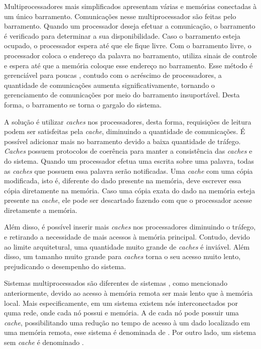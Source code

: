 Multiprocessadores \uma mais simplificados apresentam várias \cpus e memórias conectadas à um
único barramento. Comunicações nesse multiprocessador são feitas pelo
barramento. Quando um processador deseja efetuar a comunicação, o barramento é
verificado para determinar a sua disponibilidade. Caso o barramento esteja
ocupado, o processador espera até que ele fique livre. Com o barramento livre, o
processador coloca o endereço da palavra no barramento, utiliza sinais de
controle e espera até que a memória coloque esse endereço no barramento. Esse
método é gerenciável para poucas \cpus, contudo com o acréscimo de
processadores, a quantidade de comunicações aumenta significativamente, tornando
o gerenciamento de comunicações por meio do barramento insuportável. Desta
forma, o barramento se torna o gargalo do sistema.

A solução é utilizar \textit{caches} nos processadores, desta forma, requisições
de leitura podem ser satisfeitas pela \textit{cache}, diminuindo a quantidade de
comunicações. É possível adicionar mais \cpus no barramento devido a baixa
quantidade de tráfego. \textit{Caches} possuem protocolos de coerência para
manter a consistência das \textit{caches} e do sistema. Quando um processador
efetua uma escrita sobre uma palavra, todas as \textit{caches} que possuem essa
palavra serão notificadas. Uma \textit{cache} com uma cópia modificada, isto é,
diferente do dado presente na memória, deve escrever essa cópia diretamente na
memória. Caso uma cópia exata do dado na memória esteja presente na
\textit{cache}, ele pode ser descartado fazendo com que o processador acesse
diretamente a memória.

Além disso, é possível inserir mais \textit{caches} nos processadores
diminuindo o tráfego, e retirando a necessidade de mais acessos à memória
principal. Contudo, devido ao limite arquitetural, uma quantidade muito grande
de \textit{caches} é inviável. Além disso, um tamanho muito grande para
\textit{caches} torna o seu acesso muito lento, prejudicando o desempenho do
sistema.

Sistemas multiprocessados \numa são diferentes de sistemas \uma, como mencionado
anteriormente, devido ao acesso à memória remota ser mais lento que à memória
local. Mais especificamente, em um sistema \numa existem nós interconectados por
quma rede, onde cada nó possui \cpu e memória. A \cpu de cada nó pode possuir
uma \textit{cache}, possibilitando uma redução no tempo de acesso à um dado
localizado em uma memória remota, esse sistema é denominada de \ccnuma. Por outro
lado, um sistema sem \textit{cache} é denominado \ncnuma.

